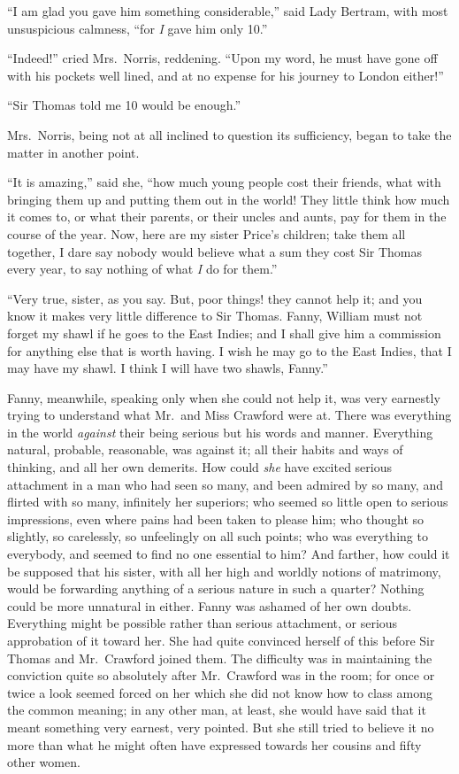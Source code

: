 \documentclass{article}
\begin{document}
``I am glad you gave him something considerable,''
said Lady Bertram, with most unsuspicious calmness,
``for \emph{I} gave him only 10.''

``Indeed!'' cried Mrs.\ Norris, reddening.  ``Upon my word,
he must have gone off with his pockets well lined,
and at no expense for his journey to London either!''

``Sir Thomas told me 10 would be enough.''

Mrs.\ Norris, being not at all inclined to question
its sufficiency, began to take the matter in another point.

``It is amazing,'' said she, ``how much young people cost
their friends, what with bringing them up and putting them
out in the world!  They little think how much it comes to,
or what their parents, or their uncles and aunts, pay for
them in the course of the year.  Now, here are my sister
Price's children; take them all together, I dare say nobody
would believe what a sum they cost Sir Thomas every year,
to say nothing of what \emph{I} do for them.''

``Very true, sister, as you say.  But, poor things!
they cannot help it; and you know it makes very little
difference to Sir Thomas.  Fanny, William must not forget
my shawl if he goes to the East Indies; and I shall give
him a commission for anything else that is worth having.
I wish he may go to the East Indies, that I may have my shawl.
I think I will have two shawls, Fanny.''

Fanny, meanwhile, speaking only when she could not help it,
was very earnestly trying to understand what Mr.\ and Miss
Crawford were at.  There was everything in the world
\emph{against} their being serious but his words and manner.
Everything natural, probable, reasonable, was against it;
all their habits and ways of thinking, and all
her own demerits.  How could \emph{she} have excited
serious attachment in a man who had seen so many,
and been admired by so many, and flirted with so many,
infinitely her superiors; who seemed so little open
to serious impressions, even where pains had been taken
to please him; who thought so slightly, so carelessly,
so unfeelingly on all such points; who was everything
to everybody, and seemed to find no one essential to him?
And farther, how could it be supposed that his sister,
with all her high and worldly notions of matrimony,
would be forwarding anything of a serious nature in such
a quarter?  Nothing could be more unnatural in either.
Fanny was ashamed of her own doubts.  Everything might
be possible rather than serious attachment, or serious
approbation of it toward her.  She had quite convinced herself
of this before Sir Thomas and Mr.\ Crawford joined them.
The difficulty was in maintaining the conviction quite
so absolutely after Mr.\ Crawford was in the room;
for once or twice a look seemed forced on her which she
did not know how to class among the common meaning;
in any other man, at least, she would have said
that it meant something very earnest, very pointed.
But she still tried to believe it no more than what he
might often have expressed towards her cousins and fifty
other women.
\end{document}

